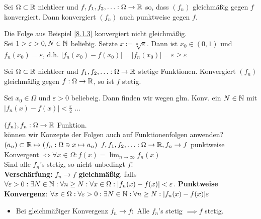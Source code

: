 \begin{sublemma}
	Sei $ \Omega \subset \mathbb{R}  $ nichtleer und $ f, f_1, f_2, \dotsc : \Omega \to \mathbb{R}  $ so, dass $ (f_n) $ gleichmäßig gegen $ f $ konvergiert.
	Dann konvergiert $ (f_n) $ auch punktweise gegen $ f $.
\end{sublemma}

\begin{subexample}
	Die Folge aus Beispiel \ref{8.1.3} konvergiert nicht gleichmäßig.\\
	Sei $ 1 > \varepsilon > 0, N \in \mathbb{N}  $ beliebig. Setzte $ x \coloneqq \sqrt[n]{\varepsilon }   $. Dann ist $ x_0 \in (0, 1) $ und $ f_n(x_0) = \varepsilon  $, d.h. $ |f_n(x_0) - f(x_0)| = |f_n(x_0)| = \varepsilon \geq \varepsilon  $
\end{subexample}

\begin{subtheorem}
	Sei $ \Omega \subset \mathbb{R}  $ nichtleer und $ f_1, f_2, \dotsc : \Omega \to \mathbb{R}  $ stetige Funktionen.
	Konvergiert $ (f_n) $ gleichmäßig gegen $ f: \Omega \to \mathbb{R}  $, so ist $ f $ stetig.
\end{subtheorem}

\begin{subproof*}
	Sei $ x_0 \in \Omega $ und $ \varepsilon > 0 $ beliebeig. Dann finden wir wegen glm. Konv. ein $ N \in \mathbb{N} $
	mit $ |f_n(x) - f(x)| < \frac{ \varepsilon  }{ 2 }  $ ...
\end{subproof*}

$ (f_n), f_n : \Omega \to \mathbb{R}  $ Funktion.\\
können wir Konzepte der Folgen auch auf Funktionenfolgen anwenden?\\
$ (a_n) \subset \mathbb{R} \mapsto (f_n : \Omega \ni x \mapsto a_n) $
$ f, f_1, f_2, \dotsc : \Omega \to \mathbb{R} , f_n \to  f  $ punktweise Konvergent $ \iff \forall x \in \Omega : f(x) = \lim_{n \to \infty} f_n(x) $\\
Sind alle $ f_n $'s stetig, so nicht unbedingt $ f $!\\
\textbf{Verschärfung:} $ f_n \to f $ \textbf{gleichmäßig}, falls $ \forall \varepsilon > 0 : \exists N \in \mathbb{N} : \forall n \geq N : \forall x \in \Omega : | f_n(x) - f(x) | < \varepsilon  $.
\begingroup
\color{green}
\textbf{Punktweise Konvergenz}:
$ \forall x \in \Omega : \forall \varepsilon > 0 : \exists N \in \mathbb{N}  : \forall n \geq N : | f_n(x) - f(x) | \varepsilon  $ 
\endgroup

\begin{itemize}
	\item Bei gleichmäßiger Konvergenz $ f_n \to f: $ Alle $ f_n $'s stetig $ \implies f $ stetig.
\end{itemize}

